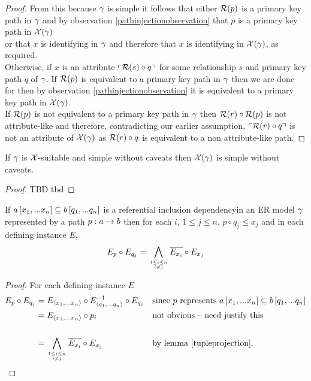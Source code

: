 \begin{proof}
From this because $\gamma$ is simple it follows that either  $\mathcal{R}(p)$ is a primary key path in $\gamma$ and by observation \ref{pathinjectionobservation} that $p$ is a primary key path in $\mathcal{X}(\gamma)$ \\

\noindent or that $x$ is identifying in $\gamma$ and therefore that $x$ is identifying in $\mathcal{X}(\gamma)$, as required.\\

Otherwise, if $x$ is an attribute $\left\ulcorner \mathcal{R}(s) \circ q\right\urcorner$ for some relationship $s$ and primary key path $q$ of $\gamma$. If $\mathcal{R}(p)$ is equivalent to a primary key path in $\gamma$
then we are done for then by observation \ref{pathinjectionobservation} it is equivalent to a primary key path in $\mathcal{X}(\gamma)$. \\


\noindent If $\mathcal{R}(p)$ is not equivalent to a primary key path in $\gamma$ then $\mathcal{R}(r) \circ \mathcal{R}(p)$ 
is not attribute-like  and therefore, contradicting our earlier assumption,  $\left\ulcorner \mathcal{R}(r) \circ q\right\urcorner$ is not an attribute of $\mathcal{X}(\gamma)$
as $\mathcal{R}(r) \circ q$ is equivalent to a non attribute-like path.
\end{proof}

\begin{lemma}
\label{wocaveatcarrythroughlemma}
If $\gamma$ is $\mathcal{X}$-suitable and simple without caveats then $\mathcal{X}(\gamma)$ is simple without caveats.
\end{lemma}
\begin{proof}
TBD
\vspace{0.5cm}
tbd
\end{proof}


\begin{lemma}
\label{inclusiondependencyrestrictionlemma}
If $a\left[x_1,...x_n\right]\subseteq b\left[q_1,...q_n\right]$ is a referential inclusion dependencyin an ER model $\gamma$ 
represented by a path $p:a \rightarrow b$ then for each $i$, $1 \leq j \leq n$, $p \circ q_j \leq x_j$
and in each defining instance $E$,
$$E_p \circ E_{q_j} = \bigwedge\limits_{\genfrac{}{}{0pt}{}{1 \leq i \leq n}{ i \neq j}}{\overline{E_{x_i}}}\circ E_{x_j}$$
\end{lemma}
\begin{proof}
For each defining instance $E$
\begin{align*}
E_p \circ E_{q_j} &=  E_{\xntuple} \circ E ^{-1}_{\qntuple} \circ E_{q_j}  && \mbox{since $p$ represents $\incd{a}{x_1,...x_n}{b}{q_1,...q_n}$} \\
                  &= E_{\xntuple} \circ p_i                              && \mbox{not obvious -- need justify this} \\                                                                 \\
									&= \bigwedge\limits_{\genfrac{}{}{0pt}{}{1 \leq i \leq n}{ i \neq j}}{\overline{E_{x_i}}}\circ E_{x_j} && \mbox{by lemma \ref{tupleprojection}.}
\end{align*}
\end{proof}

